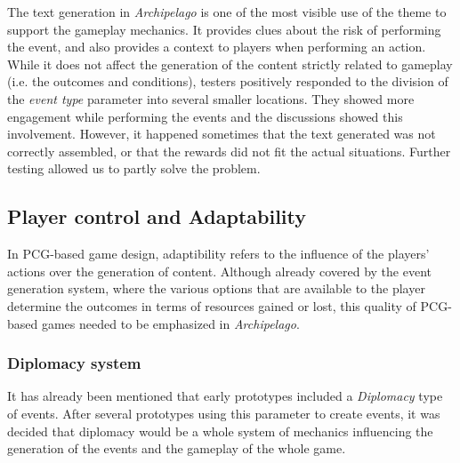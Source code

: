 The text generation in \textit{Archipelago} is one of the most visible use of the theme to support the gameplay mechanics. It provides clues about the risk of performing the event, and also provides a context to players when performing an action. While it does not affect the generation of the content strictly related to gameplay (i.e. the outcomes and conditions), testers positively responded to the division of the \textit{event type} parameter into several smaller locations. They showed more engagement while performing the events and the discussions showed this involvement. However, it happened sometimes that the text generated was not correctly assembled, or that the rewards did not fit the actual situations. Further testing allowed us to partly solve the problem.
\subsection{Player control and Adaptability}
In PCG-based game design, adaptibility refers to the influence of the players' actions over the generation of content. Although already covered by the event generation system, where the various options that are available to the player determine the outcomes in terms of resources gained or lost, this quality of PCG-based games needed to be emphasized in \textit{Archipelago}. 
\subsubsection{Diplomacy system}
It has already been mentioned that early prototypes included a \textit{Diplomacy} type of events. After several prototypes using this parameter to create events, it was decided that diplomacy would be a whole system of mechanics influencing the generation of the events and the gameplay of the whole game. 

